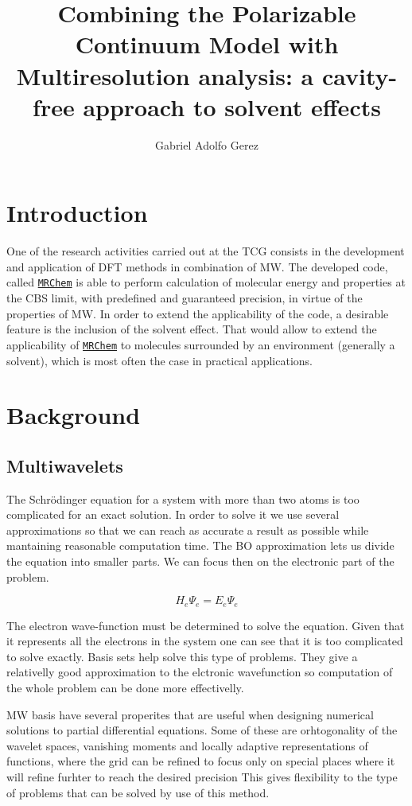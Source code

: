 \documentclass[a4paper,11pt]{article}
\title{Combining the Polarizable Continuum Model with Multiresolution
  analysis: a cavity-free approach to solvent effects}
\author{Gabriel Adolfo Gerez}
\newcommand{\mrchem}{\href{https://mrchem.readthedocs.io/en/latest/}{\texttt{MRChem}}}
\begin{document}
\maketitle

\section{Introduction}

One of the research activities carried out at the \ac{TCG} consists in
the development and application of \ac{DFT} methods in combination of
\ac{MW}. The developed code, called \mrchem{} is able to perform calculation of
molecular energy and properties at the \ac{CBS} limit, with
predefined and guaranteed precision, in virtue of the properties of
\ac{MW}. In order to extend the applicability of the code, a desirable
feature is the inclusion of the solvent effect. That would allow to
extend the applicability of \mrchem{} to molecules surrounded by an
environment (generally a solvent), which is most often the case in
practical applications.

\section{Background}

\subsection{Multiwavelets}
The Schrödinger equation for a system with more than two atoms is too
complicated for an exact solution. In order to solve it we use several
approximations so that we can reach as accurate a result as possible
while mantaining reasonable computation time.  The \ac{BO}
approximation lets us divide the equation into smaller parts. We can
focus then on the electronic part of the problem.

\begin{equation}
H_e \Psi_e = E_e \Psi_e
\end{equation}

The electron wave-function must be determined to solve the
equation. Given that it represents all the electrons in the system
one can see that it is too complicated to solve exactly. Basis sets
help solve this type of problems. They give a relativelly good
approximation to the elctronic wavefunction so computation of the
whole problem can be done more effectivelly.


\ac{MW} basis have several properites that are useful when designing
numerical solutions to partial differential equations. Some of these
are orhtogonality of the wavelet spaces, vanishing moments
and locally adaptive representations of functions, where the grid can
be refined to focus only on special places where it will refine
furhter to reach the desired precision \cite{Frediani:2013}
This gives flexibility to the type of problems that can be solved by use of
this method.
\end{document}
